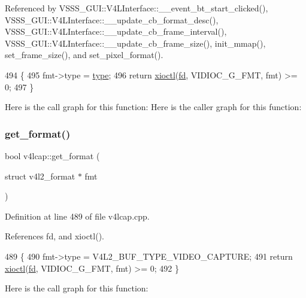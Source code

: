 Referenced by V\+S\+S\+S\+\_\+\+G\+U\+I\+::\+V4\+L\+Interface\+::\+\_\+\+\_\+event\+\_\+bt\+\_\+start\+\_\+clicked(), V\+S\+S\+S\+\_\+\+G\+U\+I\+::\+V4\+L\+Interface\+::\+\_\+\+\_\+update\+\_\+cb\+\_\+format\+\_\+desc(), V\+S\+S\+S\+\_\+\+G\+U\+I\+::\+V4\+L\+Interface\+::\+\_\+\+\_\+update\+\_\+cb\+\_\+frame\+\_\+interval(), V\+S\+S\+S\+\_\+\+G\+U\+I\+::\+V4\+L\+Interface\+::\+\_\+\+\_\+update\+\_\+cb\+\_\+frame\+\_\+size(), init\+\_\+mmap(), set\+\_\+frame\+\_\+size(), and set\+\_\+pixel\+\_\+format().


\begin{DoxyCode}
494                                                                    \{
495     fmt->type = \hyperlink{classstd_1_1conditional_1_1type}{type};
496     \textcolor{keywordflow}{return} \hyperlink{classv4lcap_ab5aaa5a8c0df17f5ca57e0b5170232cb}{xioctl}(\hyperlink{classv4lcap_a38109593bde997dad13b3a461569573d}{fd}, VIDIOC\_G\_FMT, fmt) >= 0;
497 \}
\end{DoxyCode}
Here is the call graph for this function\+:
Here is the caller graph for this function\+:
\mbox{\label{classv4lcap_a1964262e616b7624fdef18d54ea211e4}} 
\subsubsection{\texorpdfstring{get\+\_\+format()}{get\_format()}\hspace{0.1cm}{\footnotesize\ttfamily [2/2]}}
{\footnotesize\ttfamily bool v4lcap\+::get\+\_\+format (\begin{DoxyParamCaption}\item[{struct v4l2\+\_\+format $\ast$}]{fmt }\end{DoxyParamCaption})}



Definition at line 489 of file v4lcap.\+cpp.



References fd, and xioctl().


\begin{DoxyCode}
489                                                 \{
490     fmt->type = V4L2\_BUF\_TYPE\_VIDEO\_CAPTURE;
491     \textcolor{keywordflow}{return} \hyperlink{classv4lcap_ab5aaa5a8c0df17f5ca57e0b5170232cb}{xioctl}(\hyperlink{classv4lcap_a38109593bde997dad13b3a461569573d}{fd}, VIDIOC\_G\_FMT, fmt) >= 0;
492 \}
\end{DoxyCode}
Here is the call graph for this function\+:
\mbox{\label{classv4lcap_a11e01d9043a7cb3537a772cc3a5bacb5}} 
